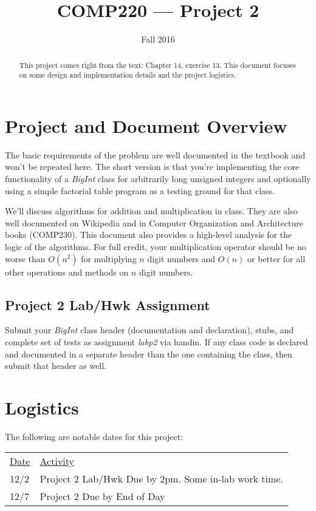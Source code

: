 \documentclass[10pt]{article}
\title{COMP220 --- Project 2}
\author{ }
\date{Fall 2016}
\begin{document}
\maketitle
\thispagestyle{empty}

\begin{abstract}
This project comes right from the text: Chapter 14, exercise 13. This document focuses on some design and implementation details and the project logistics.
\end{abstract}

\section{Project and Document Overview}

The basic requirements of the problem are well documented in the textbook and won't be repeated here. The short version is that you're implementing the core functionality of a \textit{BigInt} class for arbitrarily long unsigned integers and optionally using a simple factorial table program as a testing ground for that class.

We'll discuss algorithms for addition and multiplication in class. They are also well documented on Wikipedia and in Computer Organization and Architecture books (COMP230). This document also provides a high-level analysis for the logic of the algorithms. For full credit, your multiplication operator should be no worse than $O(n^2)$ for multiplying $n$ digit numbers and $O(n)$ or better for all other operations and methods on $n$ digit numbers.

\subsection{Project 2 Lab/Hwk Assignment}

Submit your \textit{BigInt} class header (documentation and declaration), stubs, and complete set of tests as assignment \textit{labp2} via handin. If any class code is declared and documented in a separate header than the one containing the class, then submit that header as well.

\section{Logistics}

The following are notable dates for this project:
\begin{center}
\begin{tabular}{ll}
\underline{Date} & \underline{Activity} \\
12/2 & Project 2 Lab/Hwk Due by 2pm. Some in-lab work time. \\
12/7 & Project 2 Due by End of Day
\end{tabular}
\end{center}
\end{document}
